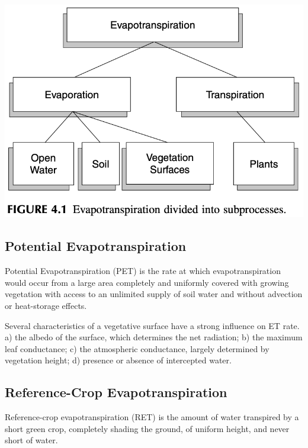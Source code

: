 \documentclass[
  letterpaper,
  DIV=11,
  numbers=noendperiod]{scrreprt}
\begin{document}
\includegraphics{archive/figures/trimble-figure4.1.png}

\hypertarget{potential-evapotranspiration}{%
\subsection{Potential
Evapotranspiration}\label{potential-evapotranspiration}}

Potential Evapotranspiration (PET) is the rate at which
evapotranspiration would occur from a large area completely and
uniformly covered with growing vegetation with access to an unlimited
supply of soil water and without advection or heat-storage effects.

Several characteristics of a vegetative surface have a strong influence
on ET rate. a) the albedo of the surface, which determines the net
radiation; b) the maximum leaf conductance; c) the atmospheric
conductance, largely determined by vegetation height; d) presence or
absence of intercepted water.

\hypertarget{reference-crop-evapotranspiration}{%
\subsection{Reference-Crop
Evapotranspiration}\label{reference-crop-evapotranspiration}}

Reference-crop evapotranspiration (RET) is the amount of water
transpired by a short green crop, completely shading the ground, of
uniform height, and never short of water.
\end{document}
